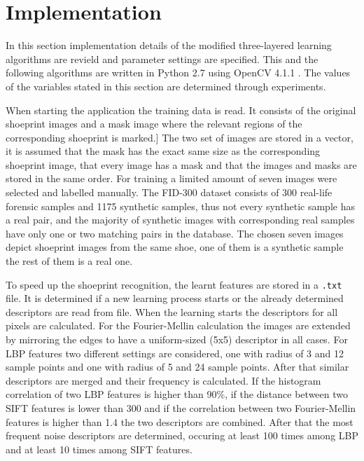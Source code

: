 \documentclass[draft,final]{vutinfth} %
\begin{document}
\section{Implementation}
\par
In this section implementation details of the modified three-layered learning algorithms are revield and parameter settings are specified.
This and the following algorithms are written in Python 2.7 \cite{van1995python} using OpenCV 4.1.1 \cite{opencv_library}.
The values of the variables stated in this section are determined through experiments.
\par
When starting the application the training data is read.
It consists of the original shoeprint images and a mask image where the relevant regions of the corresponding shoeprint is marked.]
The two set of images are stored in a vector, it is assumed that the mask has the exact same size as the corresponding shoeprint image, that every image has a mask and that the images and masks are stored in the same order.
For training a limited amount of seven images were selected and labelled manually.
The FID-300 \cite{kortylewski2014unsupervised} dataset consists of 300 real-life forensic samples and 1175 synthetic samples, thus not every synthetic sample has a real pair, and the majority of synthetic images with corresponding real samples have only one or two matching pairs in the database.
The chosen seven images depict shoeprint images from the same shoe, one of them is a synthetic sample the rest of them is a real one.
\par
To speed up the shoeprint recognition, the learnt features are stored in a \texttt{.txt} file.
It is determined if a new learning process starts or the already determined descriptors are read from file.
When the learning starts the descriptors for all pixels are calculated.
For the Fourier-Mellin calculation the images are extended by mirroring the edges to have a uniform-sized (5x5) descriptor in all cases.
For LBP features two different settings are considered, one with radius of 3 and 12 sample points and one with radius of 5 and 24 sample points.
After that similar descriptors are merged and their frequency is calculated.
If the histogram correlation of two LBP features is higher than 90\%, if the distance between two SIFT features is lower than 300 and if the correlation between two Fourier-Mellin features is higher than 1.4 the two descriptors are combined.
After that the most frequent noise descriptors are determined, occuring at least 100 times among LBP and at least 10 times among SIFT features.
\end{document}
